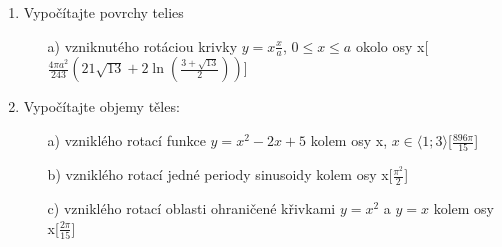 \begin{enumerate}
\item Vypočítajte povrchy telies
\begin{enumerate}
\item[a)]{vzniknutého rotáciou krivky $y=x\frac{x}{a}$, $0\leq x \leq a$ okolo osy x}\hspace{\fill}[$\frac{4\pi a^2}{243}(21 \sqrt{13}+2\ln(\frac{3+\sqrt{13}}{2}))$]

\end{enumerate}


\item Vypočítajte objemy těles:
\begin{enumerate}
\item[a)]vzniklého rotací funkce {$y=x^2-2x+5$ kolem osy x, $x \in \langle1;3\rangle$}\hspace{\fill}[$\frac{896\pi}{15}$]
\item[b)]vzniklého rotací jedné periody sinusoidy kolem osy x\hspace{\fill}[$\frac{\pi^2}{2}$]
\item[c)]vzniklého rotací oblasti ohraničené křivkami {$y=x^2$ a $y=x$ kolem osy x}\hspace{\fill}[$\frac{2\pi}{15}$]
\end{enumerate}
\end{enumerate}